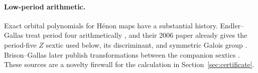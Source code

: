 \paragraph{Low-period arithmetic.}
Exact orbital polynomials for H\'enon maps have a substantial history.
Endler--Gallas treat period four arithmetically \citep{endler2002}, and
their 2006 paper already gives the period-five $Z$ sextic used below, its
discriminant, and symmetric Galois group \citep{endler2006}.
Brison--Gallas later publish transformations between the companion sextics
\citep{brison2018}.  These sources are a novelty firewall for the calculation
in Section~\ref{sec:certificate}.
